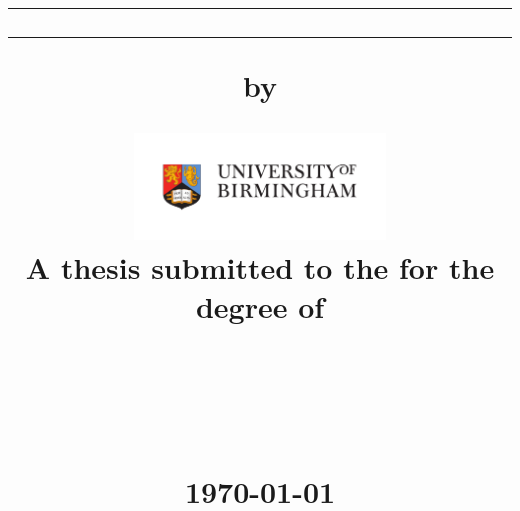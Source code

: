 \title{

\begin{singlespacing}

\large

\vspace{-100pt}

\rule{\textwidth}{2pt}
\vfill\vfill
{\Huge\textbf{\thesistitle}}
\vfill
\rule{\textwidth}{2pt}

\vfill

by

\vfill

{\LARGE\authorname}

\vfill

\includegraphics[width=0.5\textwidth]{style/logo}
\\
A thesis submitted to the {\university} for the degree of
\\
\textsc{\degreetitle}

\vfill

\begin{flushright}
\groupname
\\
\department
\\
\faculty
\\
\university
\vfill
\monthyear\today
\end{flushright}

\date{}

\end{singlespacing}

}